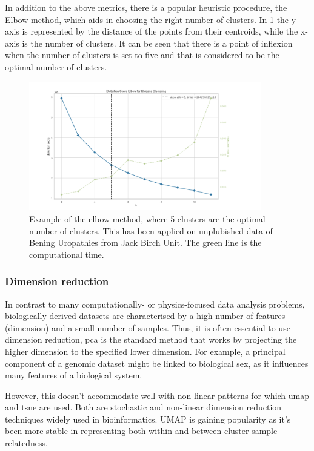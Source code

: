 In addition to the above metrics, there is a popular heuristic procedure, the Elbow method, which aids in choosing the right number of clusters. In \cref{fig:elbow_method} the y-axis is represented by the distance of the points from their centroids, while the x-axis is the number of clusters. It can be seen that there is a point of inflexion when the number of clusters is set to five and that is considered to be the optimal number of clusters.

\begin{figure}[!htb]
  \centering\includegraphics[width=0.9\textwidth,height=0.5\textheight,keepaspectratio]{Images/Clustering/elbow_method.png}
    \caption{Example of the elbow method, where 5 clusters are the optimal number of clusters. This has been applied on unplubished data of Bening Uropathies from Jack Birch Unit. The green line is the computational time. }
    \label{fig:elbow_method}
\end{figure}
\FloatBarrier


\subsubsection{Dimension reduction} \label{s:lit:dim_red}

In contrast to many computationally- or physics-focused data analysis problems, biologically derived datasets are characterised by a high number of features (dimension) and a small number of samples. Thus, it is often essential to use dimension reduction, \acrfull{pca} is the standard method that works by projecting the higher dimension to the specified lower dimension. For example, a principal component of a genomic dataset might be linked to biological sex, as it influences many features of a biological system.

However, this doesn't accommodate well with non-linear patterns for which \acrfull{umap} and \acrfull{tsne} are used. Both are stochastic and non-linear dimension reduction techniques widely used in bioinformatics. UMAP is gaining popularity as it's been more stable in representing both within and between cluster sample relatedness.

